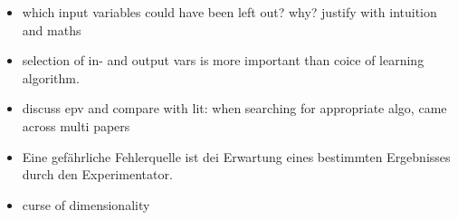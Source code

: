 \begin{itemize}
    \item which input variables could have been left out? why? justify with intuition and maths
    \item selection of in- and output vars is more important than coice of learning algorithm. 
    \item discuss epv and compare with lit: when searching for appropriate algo, came across multi papers 
    \item Eine gefährliche Fehlerquelle ist dei Erwartung eines bestimmten Ergebnisses durch den Experimentator. \cite{haertler2014statistisch}
    \item curse of dimensionality

\end{itemize}
